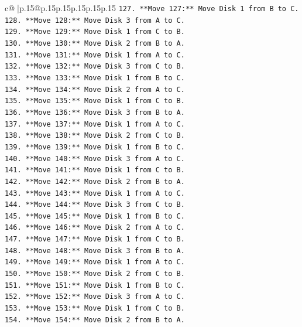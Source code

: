 \documentclass{article}
\begin{document}
{\begin{supertabular}{c@{$\;$}|p{.15\linewidth}@{}p{.15\linewidth}p{.15\linewidth}p{.15\linewidth}p{.15\linewidth}p{.15\linewidth}}
{{{\texttt{127. **Move 127:** Move Disk 1 from B to C.} \\
\texttt{128. **Move 128:** Move Disk 3 from A to C.} \\
\texttt{129. **Move 129:** Move Disk 1 from C to B.} \\
\texttt{130. **Move 130:** Move Disk 2 from B to A.} \\
\texttt{131. **Move 131:** Move Disk 1 from A to C.} \\
\texttt{132. **Move 132:** Move Disk 3 from C to B.} \\
\texttt{133. **Move 133:** Move Disk 1 from B to C.} \\
\texttt{134. **Move 134:** Move Disk 2 from A to C.} \\
\texttt{135. **Move 135:** Move Disk 1 from C to B.} \\
\texttt{136. **Move 136:** Move Disk 3 from B to A.} \\
\texttt{137. **Move 137:** Move Disk 1 from A to C.} \\
\texttt{138. **Move 138:** Move Disk 2 from C to B.} \\
\texttt{139. **Move 139:** Move Disk 1 from B to C.} \\
\texttt{140. **Move 140:** Move Disk 3 from A to C.} \\
\texttt{141. **Move 141:** Move Disk 1 from C to B.} \\
\texttt{142. **Move 142:** Move Disk 2 from B to A.} \\
\texttt{143. **Move 143:** Move Disk 1 from A to C.} \\
\texttt{144. **Move 144:** Move Disk 3 from C to B.} \\
\texttt{145. **Move 145:** Move Disk 1 from B to C.} \\
\texttt{146. **Move 146:** Move Disk 2 from A to C.} \\
\texttt{147. **Move 147:** Move Disk 1 from C to B.} \\
\texttt{148. **Move 148:** Move Disk 3 from B to A.} \\
\texttt{149. **Move 149:** Move Disk 1 from A to C.} \\
\texttt{150. **Move 150:** Move Disk 2 from C to B.} \\
\texttt{151. **Move 151:** Move Disk 1 from B to C.} \\
\texttt{152. **Move 152:** Move Disk 3 from A to C.} \\
\texttt{153. **Move 153:** Move Disk 1 from C to B.} \\
\texttt{154. **Move 154:** Move Disk 2 from B to A.} \\
}}}
\end{supertabular}}
\end{document}
